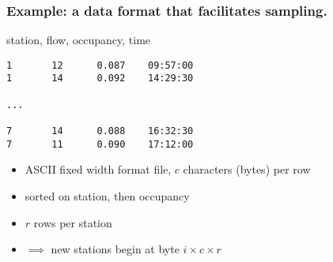 \documentclass{beamer}
\begin{document}
\begin{frame}[fragile]

    \frametitle{Example: a data format that facilitates sampling.}


station, flow, occupancy, time
\begin{verbatim}
1       12      0.087    09:57:00
1       14      0.092    14:29:30

...

7       14      0.088    16:32:30
7       11      0.090    17:12:00
\end{verbatim}

    \begin{itemize}

        \item ASCII fixed width format file, $c$ characters (bytes) per row
        \item sorted on station, then occupancy
        \item $r$ rows per station
        \item $\implies$ new stations begin at byte $i \times c \times r$

    \end{itemize}

%
%
%
%
%
%
%
%
%
%
%
%    
%



\end{frame}
\end{document}
